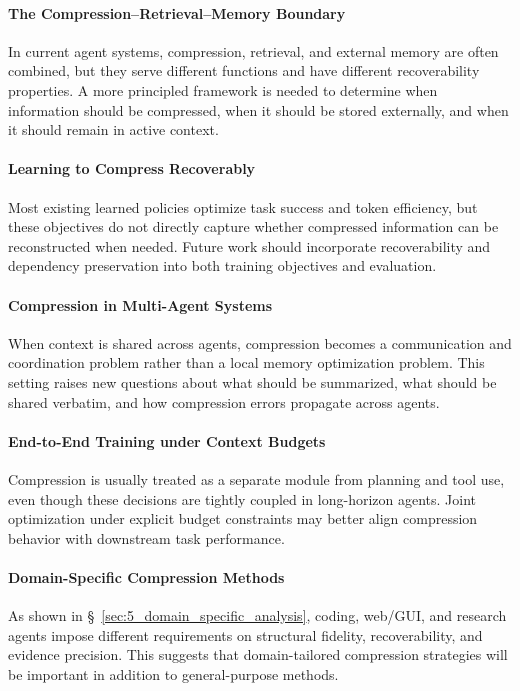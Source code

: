 \paragraph{The Compression--Retrieval--Memory Boundary}
In current agent systems, compression, retrieval, and external memory are often combined, but they serve different functions and have different recoverability properties. A more principled framework is needed to determine when information should be compressed, when it should be stored externally, and when it should remain in active context.


\paragraph{Learning to Compress Recoverably}
Most existing learned policies optimize task success and token efficiency, but these objectives do not directly capture whether compressed information can be reconstructed when needed. Future work should incorporate recoverability and dependency preservation into both training objectives and evaluation.

\paragraph{Compression in Multi-Agent Systems}
When context is shared across agents, compression becomes a communication and coordination problem rather than a local memory optimization problem. This setting raises new questions about what should be summarized, what should be shared verbatim, and how compression errors propagate across agents.

\paragraph{End-to-End Training under Context Budgets}
Compression is usually treated as a separate module from planning and tool use, even though these decisions are tightly coupled in long-horizon agents. Joint optimization under explicit budget constraints may better align compression behavior with downstream task performance.

\paragraph{Domain-Specific Compression Methods}
As shown in \S~\ref{sec:5_domain_specific_analysis}, coding, web/GUI, and research agents impose different requirements on structural fidelity, recoverability, and evidence precision. This suggests that domain-tailored compression strategies will be important in addition to general-purpose methods.

